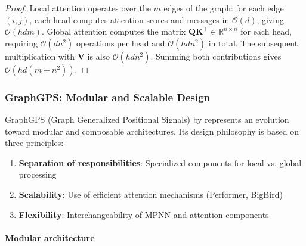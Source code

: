 \begin{proof}
Local attention operates over the $m$ edges of the graph: for each edge $(i,j)$, each head computes attention scores and messages in $\mathcal{O}(d)$, giving $\mathcal{O}(hdm)$. Global attention computes the matrix $\mathbf{Q}\mathbf{K}^\top \in \mathbb{R}^{n \times n}$ for each head, requiring $\mathcal{O}(dn^2)$ operations per head and $\mathcal{O}(hdn^2)$ in total. The subsequent multiplication with $\mathbf{V}$ is also $\mathcal{O}(hdn^2)$. Summing both contributions gives $\mathcal{O}(hd(m + n^2))$.
\end{proof}

\subsubsection{GraphGPS: Modular and Scalable Design}\label{subsubsec:graphgps_advanced}

GraphGPS (Graph Generalized Positional Signals) by \citet{rampasek2022graphgps} represents an evolution toward modular and composable architectures. Its design philosophy is based on three principles:

\begin{enumerate}
    \item \textbf{Separation of responsibilities}: Specialized components for local vs. global processing
    \item \textbf{Scalability}: Use of efficient attention mechanisms (Performer, BigBird)
    \item \textbf{Flexibility}: Interchangeability of MPNN and attention components
\end{enumerate}

\paragraph{Modular architecture}

